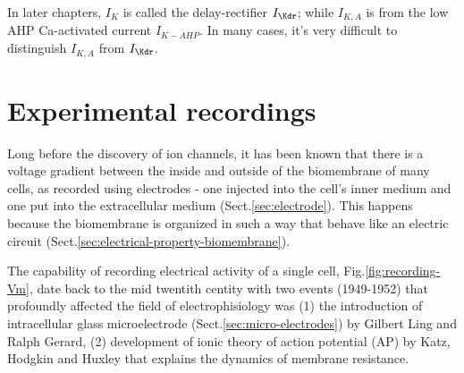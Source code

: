 In later chapters, $I_K$ is called the delay-rectifier $I_\Kdr$;
while $I_{K,A}$ is from the low AHP Ca-activated current
$I_{K-AHP}$. In many cases, it's very difficult to distinguish
$I_{K,A}$ from $I_\Kdr$.

%
%
%



\chapter{Experimental recordings}

Long before the discovery of ion channels, it has been known that there is a
voltage gradient between the inside and outside of the biomembrane of many
cells, as recorded using electrodes - one injected into the cell's inner medium
and one put into the extracellular medium (Sect.\ref{sec:electrode}).
This happens because the biomembrane is organized in such a way that behave like
an electric circuit (Sect.\ref{sec:electrical-property-biomembrane}).

The capability of recording electrical activity of a single cell,
Fig.\ref{fig:recording-Vm}, date back to the mid twentith centity with two
events (1949-1952) that profoundly affected the field of electrophisiology was
(1) the introduction of intracellular glass microelectrode
(Sect.\ref{sec:micro-electrodes}) by Gilbert Ling and Ralph Gerard, (2)
development of ionic theory of action potential (AP) by Katz, Hodgkin and Huxley
\citep{graham1946, cole1949, hodgkin1952ap} that explains the dynamics of
membrane resistance.

